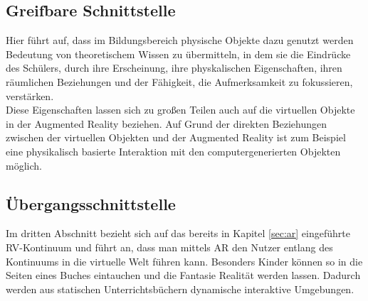 \subsection{Greifbare Schnittstelle}
Hier führt \citeauthor{billinghurst:ar-in-education} auf, dass im Bildungsbereich physische Objekte dazu genutzt werden Bedeutung von theoretischem Wissen zu übermitteln, in dem sie die Eindrücke des Schülers, durch ihre Erscheinung, ihre physkalischen Eigenschaften, ihren räumlichen Beziehungen und der Fähigkeit, die Aufmerksamkeit zu fokussieren, verstärken.\\
Diese Eigenschaften lassen sich zu großen Teilen auch auf die virtuellen Objekte in der Augmented Reality beziehen. Auf Grund der direkten Beziehungen zwischen der virtuellen Objekten und der Augmented Reality ist zum Beispiel eine physikalisch basierte Interaktion mit den computergenerierten Objekten möglich.
\subsection{Übergangsschnittstelle}
Im dritten Abschnitt bezieht sich \citeauthor{billinghurst:ar-in-education} auf das bereits in Kapitel \ref{sec:ar} eingeführte RV-Kontinuum und führt an, dass man mittels AR den Nutzer entlang des Kontinuums in die virtuelle Welt führen kann. Besonders Kinder können so in die Seiten eines Buches eintauchen und die Fantasie Realität werden lassen. Dadurch werden aus statischen Unterrichtsbüchern dynamische interaktive Umgebungen.

